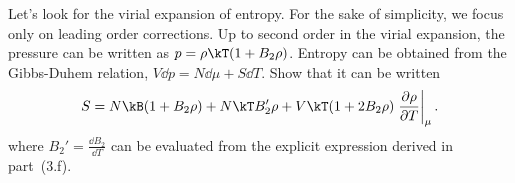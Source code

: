 \smallskip \subp
Let's look for the virial expansion of entropy.
For the sake of simplicity, we focus only on
leading order corrections.
Up to second order in the virial expansion, 
the pressure can be written as
$p = \rho \kT (1 + B_2 \rho)$.
Entropy can be obtained from the Gibbs-Duhem relation,
$V \dd p = N \dd \mu + S \dd T$.
Show that it can be written
\begin{equation}
S = N \kB (1 + B_2 \rho) +
N \kT B_2'\rho +
V \kT (1 + 2 B_2 \rho)
\left.\frac{\partial \rho}{\partial T}\right|_{\mu}.
\label{eq:Svirial}
\end{equation}
where $B_2' = \frac{\dd B_2}{\dd T}$
can be evaluated from the explicit expression
derived in part~(3.f).


